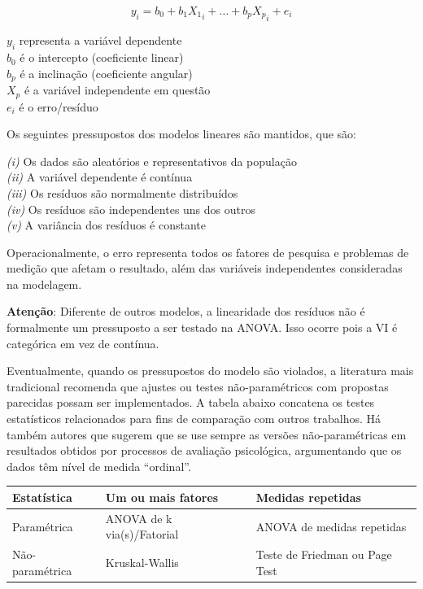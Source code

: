 \documentclass[
]{book}
\begin{document}
\[y_i = b_0 + b_1X{_1}_i + \dots + b_pX{_p}_i + e_i\]

\(y_i\) representa a variável dependente\\
\(b_0\) é o intercepto (coeficiente linear)\\
\(b_p\) é a inclinação (coeficiente angular)\\
\(X_p\) é a variável independente em questão\\
\(e_i\) é o erro/resíduo

Os seguintes pressupostos dos modelos lineares são mantidos, que são:

\emph{(i)} Os dados são aleatórios e representativos da população\\
\emph{(ii)} A variável dependente é contínua\\
\emph{(iii)} Os resíduos são normalmente distribuídos\\
\emph{(iv)} Os resíduos são independentes uns dos outros\\
\emph{(v)} A variância dos resíduos é constante

Operacionalmente, o erro representa todos os fatores de pesquisa e problemas de medição que afetam o resultado, além das variáveis independentes consideradas na modelagem.

\begin{warning}

\textbf{Atenção}: Diferente de outros modelos, a linearidade dos resíduos não é formalmente um pressuposto a ser testado na ANOVA. Isso ocorre pois a VI é categórica em vez de contínua.

\end{warning}

Eventualmente, quando os pressupostos do modelo são violados, a literatura mais tradicional recomenda que ajustes ou testes não-paramétricos com propostas parecidas possam ser implementados. A tabela abaixo concatena os testes estatísticos relacionados para fins de comparação com outros trabalhos. Há também autores que sugerem que se use sempre as versões não-paramétricas em resultados obtidos por processos de avaliação psicológica, argumentando que os dados têm nível de medida ``ordinal''.

\begin{longtable}[]{@{}lll@{}}
\toprule
Estatística & Um ou mais fatores & Medidas repetidas\tabularnewline
\midrule
\endhead
Paramétrica & ANOVA de k via(s)/Fatorial & ANOVA de medidas repetidas\tabularnewline
Não-paramétrica & Kruskal-Wallis & Teste de Friedman ou Page Test\tabularnewline
\bottomrule
\end{longtable}
\end{document}
